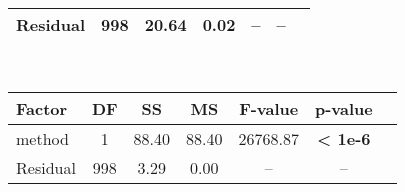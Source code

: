 \begin{table}[ht!]
\begin{minipage}{\textwidth}
\begin{tabular}{lcccccc}
    Residual  & 998  & 20.64   & 0.02    & --         & --            \\
    \bottomrule
    \end{tabular}
    \end{minipage}
    \\[1em]
    \begin{minipage}{\textwidth}
    \centering
    \begin{tabular}{lcccccc}
    \toprule
    \textbf{Factor} & \textbf{DF} & \textbf{SS}    & \textbf{MS}    & \textbf{F-value}    & \textbf{p-value}  \\
    \midrule
    method    & 1    & 88.40   & 88.40   & 26768.87   & \textbf{< 1e-6}           \\
    Residual  & 998  & 3.29    & 0.00    & --         & --            \\
    \bottomrule
    \end{tabular}
    \end{minipage}
\end{table}
